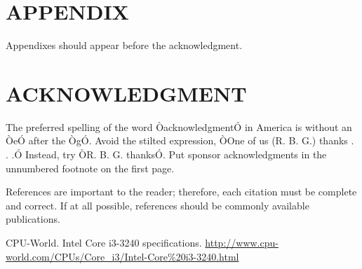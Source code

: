 \documentclass[letterpaper, 10 pt,spanish, conference]{ieeeconf}  %
\begin{document}






\section*{APPENDIX}

Appendixes should appear before the acknowledgment.

\section*{ACKNOWLEDGMENT}

The preferred spelling of the word ÒacknowledgmentÓ in America is without an ÒeÓ after the ÒgÓ. Avoid the stilted expression, ÒOne of us (R. B. G.) thanks . . .Ó  Instead, try ÒR. B. G. thanksÓ. Put sponsor acknowledgments in the unnumbered footnote on the first page.




References are important to the reader; therefore, each citation must be complete and correct. If at all possible, references should be commonly available publications.



\begin{thebibliography}{99}

 CPU-World. Intel Core i3-3240 specifications. \url{http://www.cpu-world.com/CPUs/Core_i3/Intel-Core\%20i3-3240.html}







\end{thebibliography}
\end{document}
